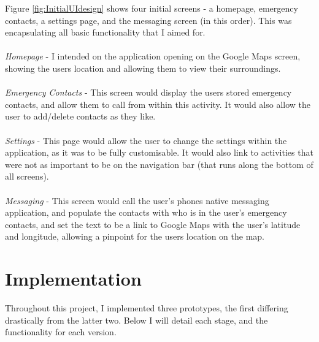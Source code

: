 \documentclass[a4paper]{report}
\begin{document}
Figure \ref{fig:InitialUIdesign} shows four initial screens - a homepage, emergency contacts, a settings page, and the messaging screen (in this order). This was encapsulating all basic functionality that I aimed for. \\ \\
\textit{Homepage} - I intended on the application opening on the Google Maps screen, showing the users location and allowing them to view their surroundings. \\ \\
\textit{Emergency Contacts} - This screen would display the users stored emergency contacts, and allow them to call from within this activity. It would also allow the user to add/delete contacts as they like. \\ \\
\textit{Settings} - This page would allow the user to change the settings within the application, as it was to be fully customisable. It would also link to activities that were not as important to be on the navigation bar (that runs along the bottom of all screens). \\ \\
\textit{Messaging} - This screen would call the user's phones native messaging application, and populate the contacts with who is in the user's emergency contacts, and set the text to be a link to Google Maps with the user's latitude and longitude, allowing a pinpoint for the users location on the map.
\chapter{Implementation}
\label{sec:Imp}
Throughout this project, I implemented three prototypes, the first differing drastically from the latter two. Below I will detail each stage, and the functionality for each version. 
\end{document}
